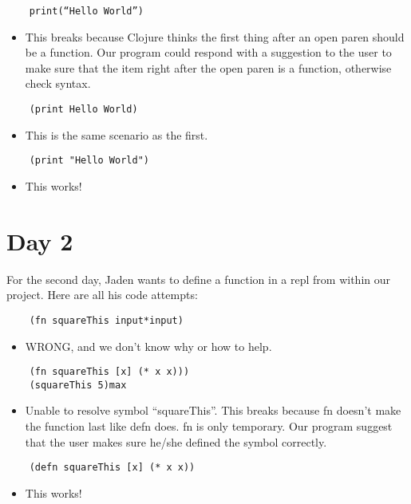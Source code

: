 \documentclass[12pt]{article}
\begin{document}
\begin{verbatim}
	print(“Hello World”)
\end{verbatim}
\begin{itemize}
	\item This breaks because Clojure thinks the first thing after an open paren should be a function. Our program could respond with a suggestion to the user to make sure that the item right after the open paren is a function, otherwise check syntax. 
\end{itemize}

\begin{verbatim}
	(print Hello World)
\end{verbatim}
\begin{itemize}
	\item This is the same scenario as the first.
\end{itemize}

\begin{verbatim}
	(print "Hello World")
\end{verbatim}
\begin{itemize}
	\item This works!
\end{itemize}

\section{Day 2}
For the second day, Jaden wants to define a function in a repl from within our project. Here are all his code attempts:

\begin{verbatim}
	(fn squareThis input*input)
\end{verbatim}
\begin{itemize}
	\item WRONG, and we don’t know why or how to help.
\end{itemize}

\begin{verbatim}
	(fn squareThis [x] (* x x)))
	(squareThis 5)max
\end{verbatim}
\begin{itemize}
	\item Unable to resolve symbol “squareThis”. This breaks because fn doesn’t make the function last like defn does. fn is only temporary. Our program suggest that the user makes sure he/she defined the symbol correctly.
\end{itemize}

\begin{verbatim}
	(defn squareThis [x] (* x x))
\end{verbatim}
\begin{itemize}
	\item This works!
\end{itemize}
\end{document}
